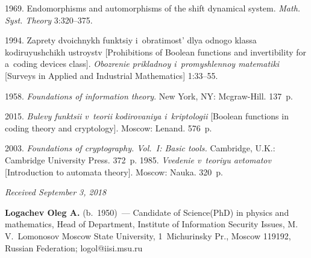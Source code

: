   \begin{multicols}{2}

\renewcommand{\bibname}{\protect\rmfamily References}

{\small\frenchspacing
 {%
 \begin{thebibliography}{9}

 1969. Endomorphisms and automorphisms of the shift dynamical 
system. \textit{Math. Syst. Theory} 3:320--375.

 1994. Zaprety dvoichnykh funktsiy i~obratimost' dlya odnogo 
klassa kodiruyushchikh ustroystv [Prohibitions of Boolean functions and 
invertibility for a~coding devices class]. 
\textit{Obozrenie prikladnoy i~promyshlennoy matematiki} 
[Surveys in Applied and Industrial Mathematics] 1:33--55.


 1958. \textit{Foundations of information theory}. 
New York, NY: Mcgraw-Hill. 137~p.

 2015. \textit{Bulevy funktsii v~teorii kodirovaniya i~kriptologii} 
 [Boolean functions in coding theory and cryptology]. Moscow: Lenand. 576~p.
 
 2003. 
\textit{Foundations of cryptography. Vol.~I: Basic tools.} Cambridge, U.K.: 
Cambridge University Press. 372~p.
1985. \textit{Vvedenie v~teoriyu avtomatov} [Introduction to automata theory]. 
Moscow: Nauka. 320~p.
\end{thebibliography}

 }
 }

\end{multicols}

\vspace*{-6pt}

\hfill{\small\textit{Received September 3, 2018}}



\Contrl

\noindent
\textbf{Logachev Oleg A.} (b.\ 1950)~--- 
Candidate of Science(PhD) in physics and mathematics, Head of Department, 
Institute of Information Security Issues, M.\,V.~Lomonosov Moscow State University, 
1~Michurinsky Pr., Moscow 119192, Russian Federation; \mbox{logol@iisi.msu.ru}
\label{end\stat}

\renewcommand{\bibname}{\protect\rm Литература}       